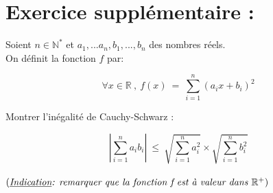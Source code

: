 \documentclass[10pt,a4paper]{article}
\newcommand{\R}{\mathbb{R}}
\newcommand{\N}{\mathbb{N}}
\theoremstyle{definition}
\theoremstyle{definition}
\begin{document}
\section*{Exercice supplémentaire :}

\noindent Soient $n\in\N^*$ et $a_1,...a_n,b_1,...,b_n$ des nombres réels. \\
On définit la fonction $f$ par:

$$\forall x \in \R ~, ~f(x) \ = \ \sum\limits_{i=1}^{n}(a_ix+b_i)^2$$

Montrer l'inégalité de Cauchy-Schwarz :

 $$\left|\sum\limits_{i=1}^{n}a_ib_i\right| \ \leq \ \sqrt{\sum\limits_{i=1}^{n}a_i^2} \times \sqrt{\sum\limits_{i=1}^{n}b_i^2}$$
\quad \\

$\left(\textit{\underline{Indication}: remarquer que la fonction f est à valeur dans $\R^+$}\right)$
\end{document}
